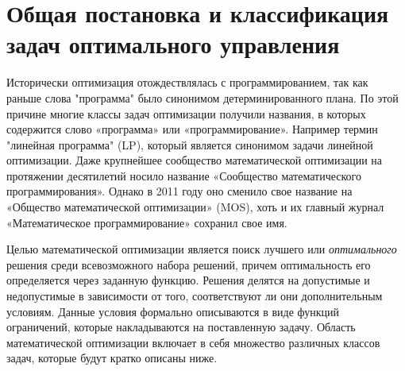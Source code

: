  
\section{Общая постановка и классификация задач оптимального управления}\label{1sec:optimal-control-tasks}


Исторически оптимизация отождествлялась с программированием, так как раньше слова "программа" было синонимом детерминированного плана. По этой причине многие классы задач оптимизации получили названия, в которых содержится слово «программа» или «программирование». Например термин "линейная программа" (LP), который является синонимом задачи линейной оптимизации. Даже крупнейшее сообщество математической оптимизации на протяжении десятилетий носило название «Сообщество математического программирования». Однако в 2011 году оно сменило свое название на «Общество математической оптимизации» (MOS), хоть и их главный журнал «Математическое программирование» сохранил свое имя. 

Целью математической оптимизации является поиск лучшего или {\it оптимального} решения среди всевозможного набора решений, причем оптимальность его определяется через заданную функцию. Решения делятся на допустимые и недопустимые в зависимости от того, соответствуют ли они дополнительным условиям. Данные условия формально описываются в виде функций ограничений, которые накладываются на поставленную задачу. Область математической оптимизации включает в себя множество различных классов задач, которые будут кратко описаны ниже.

